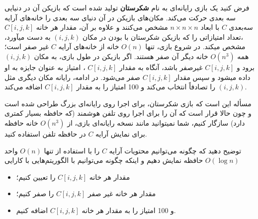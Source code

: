 \documentclass[]{article}
\begin{document}
فرض کنید یک بازی رایانه‌­ای به نام
\textbf{شکرستان}
تولید شده است که بازیکن آن در دنیایی سه بعدی حرکت می‌­کند.
مکان­‌های بازیکن در آن دنیای سه بعدی را خانه­‌های آرایه سه‌بعدی
$C$
با ابعاد
$n \times n \times n$
مشخص می­‌کنند و علاوه بر آن، مقدار هر خانه
$C[i, j, k]$
،تعداد امتیازاتی را که 
بازیکن شکرستان با بودن در مکان
$(i, j, k)$
به دست می­آورد، مشخص می­کند. در شروع بازی، تنها
$O(n)$
خانه از خانه‌­های آرایه­
$C$ 
غیر صفر است؛ همه
$O(n^3)$
خانه دیگر آن صفر هستند. 
اگر بازیکن در طول بازی، به مکان
$(i, j, k)$
برود و
$C[i, j, k]$
غیرصفر باشد، آنگاه به مقدار
$C[i, j, k]$
،
امتیاز به عنوان جایزه به او داده می­شود و سپس مقدار
$C[i, j, k]$
صفر می‌شود. در ادامه، رایانه مکان دیگری مثل
$(i, j, k)$
را تصادفاً انتخاب می­‌کند
و 100 امتیاز را به مقدار
$C[i, j, k]$
اضافه می‌­کند.

مسأله این است که بازی شکرستان، برای اجرا روی رایانه­‌ای بزرگ طراحی شده است
و چون حالا قرار است که آن را برای اجرا روی تلفن هوشمند 
(که حافظه بسیار کمتری دارد)
سازگار کنیم، شما نمی­توانید مانند نسخه رایانه­‌ای بازی، از
$O(n^3)$
خانه حافظه برای نمایش آرایه
$C$
در حافظه تلفن استفاده کنید.

توضیح دهید که چگونه می‌توانیم محتویات آرایه
$C$
را با استفاده از تنها
$O(n)$
واحد حافظه نمایش دهیم و اینکه چگونه می‌توانیم با الگوریتم‌هایی با کارایی
$O(\log n)$
\begin{itemize}
    \item مقدار هر خانه
    $C[i, j, k]$
    را تعیین کنیم؛
    \item مقدار هر خانه غیر صفر
    $C[i, j, k]$
    را صفر کنیم؛
    \item و 100 امتیاز را به مقدار هر خانه
    $C[i, j, k]$
    اضافه کنیم.
\end{itemize}
  
\end{document}
